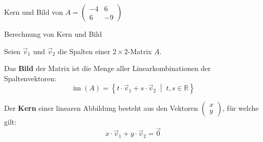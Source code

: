 


\begin{bsp}
    {Kern und Bild von  \( A = \begin{pmatrix} -4 & 6 \\ 6 & -9 \end{pmatrix} \)}{}

    \vspace*{19 cm}
\end{bsp}
\clearpage
\begin{satz}
    {Berechnung von Kern und Bild}{}
    
Seien \( \vec{v}_1 \) und \( \vec{v}_2 \) die Spalten einer \( 2 \times 2 \)-Matrix \( A \).

\medskip

Das \textbf{Bild} der Matrix ist die Menge aller Linearkombinationen der Spaltenvektoren:
\[
\operatorname{im}(A) = \left\{ t \cdot \vec{v}_1 + s \cdot \vec{v}_2 \;\middle|\; t, s \in \mathbb{R} \right\}
\]

\medskip

Der \textbf{Kern} einer linearen Abbildung besteht aus den Vektoren \( \begin{pmatrix} x \\ y \end{pmatrix} \), für welche gilt:
\[
x \cdot \vec{v}_1 + y \cdot \vec{v}_2 = \vec{0}
\]

\end{satz}

